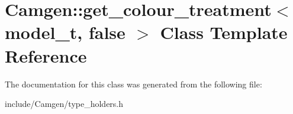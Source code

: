 \hypertarget{a00241}{\section{Camgen\-:\-:get\-\_\-colour\-\_\-treatment$<$ model\-\_\-t, false $>$ Class Template Reference}
\label{a00241}
}


The documentation for this class was generated from the following file\-:\begin{DoxyCompactItemize}
\item 
include/\-Camgen/type\-\_\-holders.\-h\end{DoxyCompactItemize}

